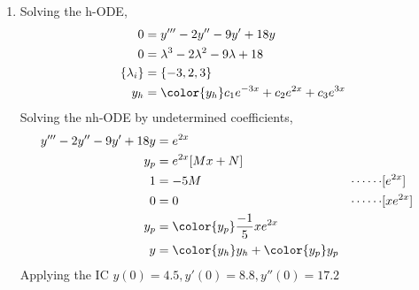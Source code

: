 \begin{enumerate}
\begin{figure}[H]
          \end{figure}

    \item Solving the h-ODE,
          \begin{align}
              0               & = y''' - 2y'' - 9y'+ 18y                            \\
              0               & = \lambda^{3} - 2\lambda^{2} - 9\lambda + 18        \\
              \{\lambda_{i}\} & = \{-3, 2, 3\}                                      \\
              y_{h}           & = \color{y_h} c_1 e^{-3x} + c_2 e^{2x} + c_3 e^{3x}
          \end{align}
          Solving the nh-ODE by undetermined coefficients,
          \begin{align}
              y''' - 2y'' - 9y'+ 18y & = e^{2x}                                      \\
              y_{p}                  & = e^{2x}[Mx + N]                              \\
              1                      & = -5M                                       &
              \cdots\cdots           & [e^{2x}]                                      \\
              0                      & = 0                                         &
              \cdots\cdots           & [xe^{2x}]                                     \\
              y_{p}                  & = \color{y_p} \frac{-1}{5}xe^{2x}             \\
              y                      & = {\color{y_h} y_{h}} + {\color{y_p} y_{p}}
          \end{align}
          Applying the IC $ y(0) = 4.5, y'(0) = 8.8, y''(0) = 17.2 $
          \begin{align}

\end{align}
\end{enumerate}
